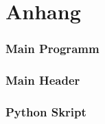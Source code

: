 \chapter{Anhang}
\subsection{Main Programm}

\newpage
\subsection{Main Header}

\newpage
\subsection{Python Skript}
